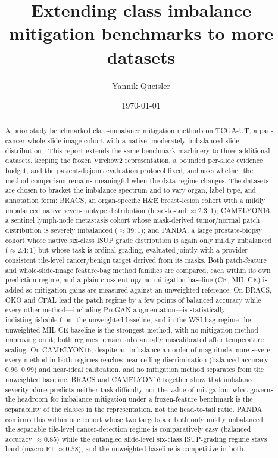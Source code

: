 \documentclass[11pt]{article}
\title{Extending class imbalance mitigation benchmarks to more datasets}
\author{Yannik Queisler}
\date{\today}
\begin{document}
\maketitle

\begin{abstract}
\noindent A prior study benchmarked class-imbalance mitigation methods on TCGA-UT, a pan-cancer whole-slide-image cohort with a native, moderately imbalanced slide distribution \citep{queisler2026imbalanceTCGA}. This report extends the same benchmark machinery to three additional datasets, keeping the frozen Virchow2 representation, a bounded per-slide evidence budget, and the patient-disjoint evaluation protocol fixed, and asks whether the method comparison remains meaningful when the data regime changes. The datasets are chosen to bracket the imbalance spectrum and to vary organ, label type, and annotation form: BRACS, an organ-specific H\&E breast-lesion cohort with a mildly imbalanced native seven-subtype distribution (head-to-tail ${\approx}2.3{:}1$); CAMELYON16, a sentinel lymph-node metastasis cohort whose mask-derived tumor/normal patch distribution is severely imbalanced (${\approx}39{:}1$); and PANDA, a large prostate-biopsy cohort whose native six-class ISUP grade distribution is again only mildly imbalanced (${\approx}2.4{:}1$) but whose task is ordinal grading, evaluated jointly with a provider-consistent tile-level cancer/benign target derived from its masks. Both patch-feature and whole-slide-image feature-bag method families are compared, each within its own prediction regime, and a plain cross-entropy no-mitigation baseline (CE, MIL CE) is added so mitigation gains are measured against an unweighted reference. On BRACS, OKO and CFAL lead the patch regime by a few points of balanced accuracy while every other method---including ProGAN augmentation---is statistically indistinguishable from the unweighted baseline, and in the WSI-bag regime the unweighted MIL CE baseline is the strongest method, with no mitigation method improving on it; both regimes remain substantially miscalibrated after temperature scaling. On CAMELYON16, despite an imbalance an order of magnitude more severe, every method in both regimes reaches near-ceiling discrimination (balanced accuracy \num{0.96}--\num{0.99}) and near-ideal calibration, and no mitigation method separates from the unweighted baseline. BRACS and CAMELYON16 together show that imbalance severity alone predicts neither task difficulty nor the value of mitigation: what governs the headroom for imbalance mitigation under a frozen-feature benchmark is the separability of the classes in the representation, not the head-to-tail ratio. PANDA confirms this within one cohort whose two targets are both only mildly imbalanced: the separable tile-level cancer-detection regime is comparatively easy (balanced accuracy ${\approx}\num{0.85}$) while the entangled slide-level six-class ISUP-grading regime stays hard (macro F1 ${\approx}\num{0.58}$), and the unweighted baseline is competitive in both.
\end{abstract}
\end{document}
